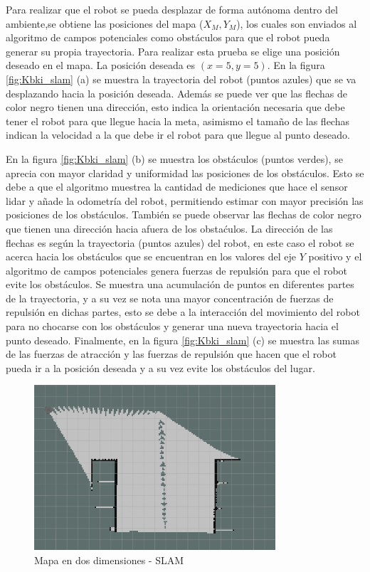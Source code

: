 Para  realizar que el robot se pueda desplazar de forma autónoma dentro del ambiente,se 
obtiene las posiciones del mapa ($X_{M}, Y_{M}$), los cuales son enviados al algoritmo 
de campos potenciales como obstáculos para que el robot pueda generar su propia 
trayectoria. Para realizar esta prueba se elige una posición deseado en el mapa. La 
posición deseada es $(x = 5, y = 5)$. En la figura \ref{fig:Kbki_slam} (a) se muestra 
la trayectoria del robot (puntos azules) que se va desplazando hacia la posición 
deseada. Además se puede ver que las flechas de color negro tienen una dirección, esto
indica la orientación necesaria que debe tener el robot para que llegue hacia la meta, 
asimismo el tamaño de las flechas indican la velocidad a la que debe ir el robot para 
que llegue al punto deseado. 

En la figura \ref{fig:Kbki_slam} (b) se muestra los obstáculos (puntos verdes), se 
aprecia con mayor claridad y uniformidad las posiciones de los obstáculos. Esto se debe 
a que el algoritmo muestrea la cantidad de mediciones que hace el sensor lidar y añade 
la odometría del robot, permitiendo estimar con mayor precisión las posiciones de los 
obstáculos. También se puede observar las flechas de color negro que tienen una dirección 
hacia afuera de los obstaćulos. La dirección de las flechas es según la trayectoria 
(puntos azules) del robot, en este caso el robot se acerca hacia los obstáculos que se 
encuentran en los valores del eje $Y$ positivo y el algoritmo de campos potenciales 
genera fuerzas de repulsión para que el robot evite los obstáculos. Se muestra una 
acumulación de puntos en diferentes partes de la trayectoria, y a su vez se nota una 
mayor concentración de fuerzas de repulsión en dichas partes, esto se debe a la interacción 
del movimiento del robot para no chocarse con los obstáculos y generar una nueva trayectoria 
hacia el punto deseado. Finalmente, en la figura \ref{fig:Kbki_slam} (c) se muestra las sumas 
de las fuerzas de atracción y las fuerzas de repulsión que hacen que el robot pueda ir a la 
posición deseada y a su vez evite los obstáculos del lugar.

\begin{figure}
  \centering \footnotesize
  \includegraphics[width=0.80\textwidth]{images/map_slam.png}
  \captionsetup{font=footnotesize}
  \caption{Mapa en dos dimensiones - SLAM}
  \label{fig:SLAM_2D}
\end{figure}

